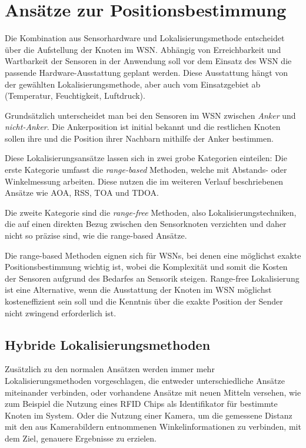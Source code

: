 \documentclass[12pt, a4wide]{scrreprt}
\begin{document}
\chapter{Ansätze zur Positionsbestimmung}
Die Kombination aus Sensorhardware und Lokalisierungsmethode entscheidet über die Aufstellung der Knoten im \acs{WSN}. Abhängig von  Erreichbarkeit und Wartbarkeit der Sensoren in der Anwendung soll vor dem Einsatz des WSN die passende Hardware-Ausstattung geplant werden. Diese Ausstattung hängt von der gewählten Lokalisierungsmethode, aber auch vom Einsatzgebiet ab (Temperatur, Feuchtigkeit, Luftdruck).

Grundsätzlich unterscheidet man bei den Sensoren im WSN zwischen \textit{Anker} und \textit{nicht-Anker}. Die Ankerposition ist initial bekannt und die restlichen Knoten sollen ihre und die Position ihrer Nachbarn mithilfe der Anker bestimmen.

Diese Lokalisierungsansätze lassen sich in zwei grobe Kategorien einteilen\cite{area_based}: Die erste Kategorie umfasst die \textit{range-based} Methoden, welche mit Abstands- oder Winkelmessung arbeiten. Diese nutzen die im weiteren Verlauf beschriebenen Ansätze wie \ac{AOA}, \ac{RSS}, \ac{TOA} und \ac{TDOA}.

Die zweite Kategorie sind die \textit{range-free} Methoden, also Lokalisierungstechniken, die auf einen direkten Bezug zwischen den Sensorknoten verzichten und daher nicht so präzise sind, wie die range-based Ansätze. 

Die range-based Methoden eignen sich für WSNs, bei denen eine möglichst exakte Positionsbestimmung wichtig ist, wobei die Komplexität und somit die Kosten der Sensoren aufgrund des Bedarfes an Sensorik steigen. Range-free Lokalisierung ist eine Alternative, wenn die Ausstattung der Knoten im WSN möglichst kosteneffizient sein soll und die Kenntnis über die exakte Position der Sender nicht zwingend erforderlich ist.

\section{Hybride Lokalisierungsmethoden}
Zusätzlich zu den normalen Ansätzen werden immer mehr Lokalisierungsmethoden vorgeschlagen, die entweder unterschiedliche Ansätze miteinander verbinden\cite{rss-doa}, oder vorhandene Ansätze mit neuen Mitteln versehen, wie zum Beispiel die Nutzung eines RFID Chips als Identifikator für bestimmte Knoten im System\cite{rfid}. Oder die Nutzung einer Kamera, um die gemessene Distanz mit den aus Kamerabildern entnommenen Winkelinformationen zu verbinden, mit dem Ziel, genauere Ergebnisse zu erzielen\cite{range-video}.\\
\end{document}

